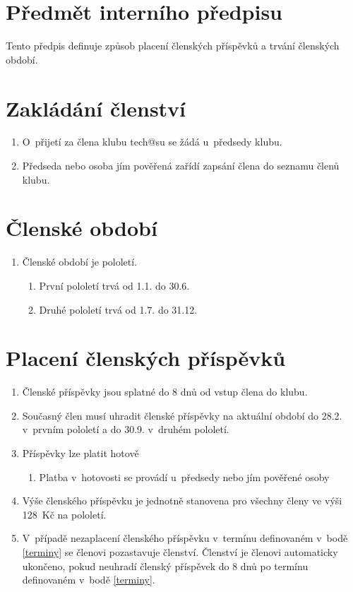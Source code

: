 \documentclass[10pt]{article}
\begin{document}
\section{Předmět interního předpisu}
	Tento předpis definuje způsob placení členských příspěvků a trvání členských období.

\section{Zakládání členství}
	\begin{enumerate}
		\item O~přijetí za člena klubu tech@su se žádá u~předsedy klubu.
		\item Předseda nebo osoba jím pověřená zařídí zapsání člena do seznamu členů klubu.
	\end{enumerate}
\section{Členské období}
	\begin{enumerate}
		\item Členské období je pololetí.
		\begin{enumerate}
			\item První pololetí trvá od 1.1. do 30.6.
			\item Druhé pololetí trvá od 1.7. do 31.12.
		\end{enumerate}
	\end{enumerate}
\section{Placení členských příspěvků}
	\begin{enumerate}
		\item Členské příspěvky jsou splatné do 8 dnů od vstup člena do klubu.
		\item \label{terminy} Současný člen musí uhradit členské příspěvky na aktuální období do 28.2. v~prvním pololetí a do 30.9. v~druhém pololetí.

		\item Příspěvky lze platit hotově%
			\begin{enumerate}
				\item Platba v~hotovosti se provádí u~předsedy nebo jím pověřené osoby
			\end{enumerate}
		\item Výše členského příspěvku je jednotně stanovena pro všechny členy ve výši 128~Kč na pololetí.
		\item V~případě nezaplacení členského příspěvku v~termínu definovaném v~bodě \ref{terminy} se členovi pozastavuje členství. Členství je členovi automaticky ukončeno, pokud neuhradí členský příspěvek do 8 dnů po termínu definovaném v~bodě \ref{terminy}.

	\end{enumerate}
\end{document}
